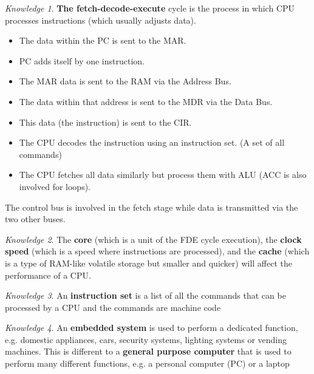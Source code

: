 \documentclass[8pt]{article}
\theoremstyle{remark}
\newtheorem{knowledge}{Knowledge}[subsection]
\begin{document}
            \begin{knowledge}
                \textbf{The fetch-decode-execute} cycle is the process in which CPU processes instructions (which usually adjusts data).

                \begin{itemize}
                    \item The data within the PC is sent to the MAR.
                    \item PC adds itself by one instruction.
                    \item The MAR data is sent to the RAM via the Address Bus.
                    \item The data within that address is sent to the MDR via the Data Bus.
                    \item This data (the instruction) is sent to the CIR.
                    \item The CPU decodes the instruction using an instruction set. (A set of all commands)
                    \item The CPU fetches all data similarly but process them with ALU (ACC is also involved for loops).
                \end{itemize}

                The control bus is involved in the fetch stage while data is transmitted via the two other buses.
            \end{knowledge}

            \begin{knowledge}
                The \textbf{core} (which is a unit of the FDE cycle execution), the \textbf{clock speed} (which is a speed where instructions are processed), and the \textbf{cache} (which is a type of RAM-like volatile storage but smaller and quicker) will affect the performance of a CPU.
            \end{knowledge}

            \begin{knowledge}
                An \textbf{instruction set} is a list of all the commands that can be processed by a CPU and the commands are machine code
            \end{knowledge}

            \begin{knowledge}
                An \textbf{embedded system} is used to perform a dedicated function, e.g. domestic appliances, cars, security systems, lighting systems or vending machines. This is different to a \textbf{general purpose computer} that is used to perform many different functions, e.g. a personal computer (PC) or a laptop
            \end{knowledge}
\end{document}
